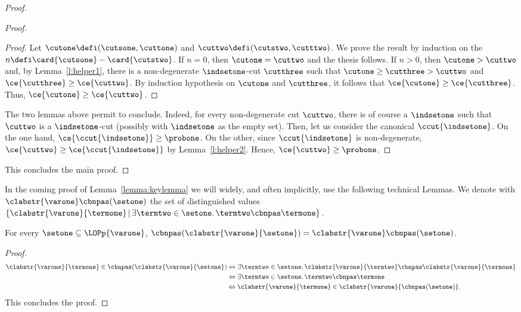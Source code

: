 \begin{proof}
\begin{varitemize}
\begin{proof}
\begin{varitemize}
\begin{proof}
          Let $\cutone\defi(\cutsone,\cuttone)$ and
          $\cuttwo\defi(\cutstwo,\cutttwo)$. We prove the result by induction
          on the $n\defi\card{\cutsone}-\card{\cutstwo}$. If $n=0$, then
          $\cutone=\cuttwo$ and the thesis follows. If $n>0$, then
          $\cutone>\cuttwo$ and, by Lemma~\ref{l:helper1}, there is a
          non-degenerate $\indsetone$-cut $\cutthree$ such that
          $\cutone\geq\cutthree>\cuttwo$ and
          $\ce{\cutthree}\geq\ce{\cuttwo}$. By induction hypothesis on
          $\cutone$ and $\cutthree$, it follows that
          $\ce{\cutone}\geq\ce{\cutthree}$. Thus,
          $\ce{\cutone}\geq\ce{\cuttwo}$.
        \end{proof}
      \end{varitemize}
      The two lemmas above permit to conclude. Indeed, for every
      non-degenerate cut $\cuttwo$, there is of course a $\indsetone$ such
      that $\cuttwo$ is a $\indsetone$-cut (possibly with $\indsetone$ as the
      empty set). Then, let us consider the canonical $\ccut{\indsetone}$. On
      the one hand, $\ce{\ccut{\indsetone}}\geq\probone$. On the other, since
      $\ccut{\indsetone}$ is non-degenerate,
      $\ce{\cuttwo}\geq\ce{\ccut{\indsetone}}$ by
      Lemma~\ref{l:helper2}. Hence, $\ce{\cuttwo}\geq\probone$.
    \end{proof}
  \end{varitemize}
  This concludes the main proof.\end{proof}
 
In the coming proof of Lemma~\ref{lemma:keylemma} we will widely, and often
implicitly, use the following technical Lemmas. We denote with
$\clabstr{\varone}\cbnpas(\setone)$ the set of distinguished values
$\{\clabstr{\varone}{\termone}\,|\,\exists\termtwo\in\setone.\,\termtwo\cbnpas\termone\}$.
\begin{lemma}\label{lemma:pascommval}
  For every $\setone\subseteq\LOPp{\varone}$,
  $\cbnpas(\clabstr{\varone}{\setone})=\clabstr{\varone}\cbnpas(\setone)$.
\end{lemma}
\begin{proof}
  \begin{align*}
    \clabstr{\varone}{\termone}\in\cbnpas(\clabstr{\varone}{\setone})&\Leftrightarrow
    \exists\termtwo\in\setone.\,\clabstr{\varone}{\termtwo}\cbnpas\clabstr{\varone}{\termone}\\
    &\Leftrightarrow\exists\termtwo\in\setone.\,\termtwo\cbnpas\termone\\
    &\Leftrightarrow\clabstr{\varone}{\termone}\in\clabstr{\varone}{\cbnpas(\setone)}.
  \end{align*}
  This concludes the proof.
\end{proof}

